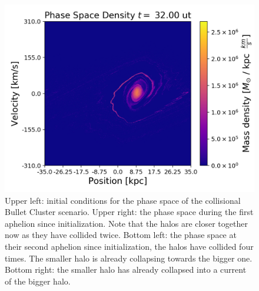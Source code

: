 \begin{figure}[h!]
    \includegraphics[scale=0.45]{imag/cBulletPhase80.png}
    \caption{Upper left: initial conditions for the phase space of the collisional Bullet Cluster scenario. Upper right: the phase space during the first aphelion since initialization. Note that the halos are closer together now as they have collided twice.  Bottom left: the phase space at their second aphelion since initialization, the halos have collided four times. The smaller halo is already collapsing towards the bigger one. Bottom right: the smaller halo has already collapsed into a current of  the bigger halo.}
    \label{phaseColBullet}
\end{figure}

